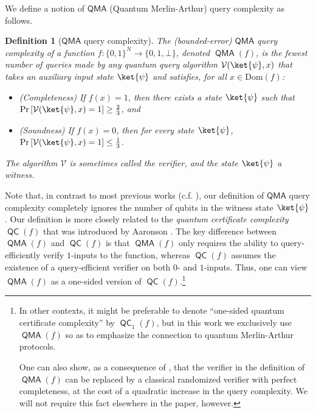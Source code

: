 \documentclass[11pt]{article}%
\newtheorem{definition}[theorem]{Definition}
\newcommand{\Dom}{\mathrm{Dom}}
\DeclareMathOperator{\QMA}{\mathsf{QMA}}
\DeclareMathOperator{\QC}{\mathsf{QC}}
\begin{document}
We define a notion of $\mathsf{QMA}$ (Quantum Merlin-Arthur) query complexity as follows.

\begin{definition}[$\mathsf{QMA}$ query complexity]
\label{def:qma_query_complexity}
The \emph{(bounded-error) $\mathsf{QMA}$ query complexity} of a function $f: \{0,1\}^N \to \{0,1,\bot\}$, denoted $\QMA(f)$, is the fewest number of queries made by any quantum query algorithm $\mathcal{V}(\ket{\psi}, x)$ that takes an auxiliary input state $\ket{\psi}$ and satisfies, for all $x \in \Dom(f)$:
\begin{itemize}
\item (Completeness) If $f(x) = 1$, then there exists a state $\ket{\psi}$ such that $\Pr\left[\mathcal{V}(\ket{\psi}, x) = 1 \right] \ge \frac{2}{3}$, and
\item (Soundness) If $f(x) = 0$, then for every state $\ket{\psi}$, $\Pr\left[\mathcal{V}(\ket{\psi}, x) = 1 \right] \le \frac{1}{3}$.
\end{itemize}
The algorithm $\mathcal{V}$ is sometimes called the \emph{verifier}, and the state $\ket{\psi}$ a \emph{witness}.
\end{definition}

Note that, in contrast to most previous works (c.f. \cite{RS04,AKKT20,ST19}), our definition of $\mathsf{QMA}$ query complexity completely ignores the number of qubits in the witness state $\ket{\psi}$. Our definition is more closely related to the \textit{quantum certificate complexity} $\QC(f)$ that was introduced by Aaronson \cite{Aar08}. The key difference between $\QMA(f)$ and $\QC(f)$ is that $\QMA(f)$ only requires the ability to query-efficiently verify $1$-inputs to the function, whereas $\QC(f)$ assumes the existence of a query-efficient verifier on both $0$- and $1$-inputs. Thus, one can view $\QMA(f)$ as a one-sided version of $\QC(f)$.\footnote{In other contexts, it might be preferable to denote ``one-sided quantum certificate complexity'' by $\QC_1(f)$, but in this work we exclusively use $\QMA(f)$ so as to emphasize the connection to quantum Merlin-Arthur protocols.

One can also show, as a consequence of \cite[Theorems 4 and 7]{Aar08}, that the verifier in the definition of $\QMA(f)$ can be replaced by a classical randomized verifier with perfect completeness, at the cost of a quadratic increase in the query complexity. We will not require this fact elsewhere in the paper, however.} %
\end{document}
